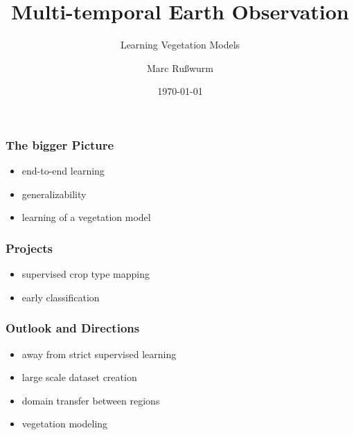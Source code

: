 \documentclass[%
  aspectratio=169,
  9pt,
  USenglish,
  titlegraphic, %
  affiliationintitlepagehead,
  progressbar,
]{beamer}
\title{Multi-temporal Earth Observation}
\subtitle{Learning Vegetation Models}
\author[M. Rußwurm]{Marc Rußwurm}
\institute[TUM]{Technical University of Munich, Germany\\
                Remote Sensing Technology}
\date{\today}
\begin{document}
\begin{frame}[t]
  \titlepage
\end{frame}

\begin{frame}
  \frametitle{The bigger Picture}
  \begin{itemize}
  	\item end-to-end learning
  	\item generalizability
  	\item learning of a vegetation model
  \end{itemize}
\end{frame}


\begin{frame}
\frametitle{Projects}

\begin{itemize}
	\item supervised crop type mapping
	\item early classification
\end{itemize}

\end{frame}

\begin{frame}
	\frametitle{Outlook and Directions}
	\begin{itemize}
		\item away from strict supervised learning
		\item large scale dataset creation
		\item domain transfer between regions
		\item vegetation modeling
	\end{itemize}
\end{frame}
\end{document}
